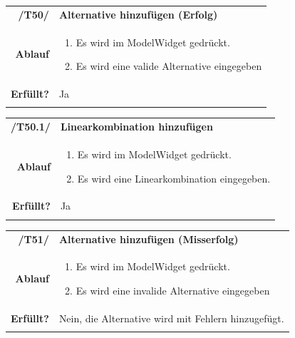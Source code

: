 \documentclass{article}
\newcommand{\guibutton}[1]{\fbox{\texttt{#1}}}
\begin{document}
\begin{table}[H]
\begin{tabularx}{\textwidth}{rX}
\vspace{1mm}
\textbf{/T50/}         & \textbf{Alternative hinzufügen (Erfolg)} \\ \vspace{1mm}
\textbf{Ablauf} & 
\begin{enumerate}
        \item Es wird \guibutton{+} im ModelWidget gedrückt.
        \item Es wird eine valide Alternative eingegeben
    \end{enumerate} \\ \vspace{1mm}
\textbf{Erfüllt?}  & Ja  \\ \vspace{1mm}
\end{tabularx}
\end{table}

\begin{table}[H]
\begin{tabularx}{\textwidth}{rX}
\vspace{1mm}
\textbf{/T50.1/}         & \textbf{Linearkombination hinzufügen} \\ \vspace{1mm}
\textbf{Ablauf} & 
\begin{enumerate}
        \item Es wird \guibutton{+} im ModelWidget gedrückt.
        \item Es wird eine Linearkombination eingegeben.
    \end{enumerate} \\ \vspace{1mm}
\textbf{Erfüllt?}  & Ja  \\ \vspace{1mm}
\end{tabularx}
\end{table}

\begin{table}[H]
\begin{tabularx}{\textwidth}{rX}
\vspace{1mm}
\textbf{/T51/}         & \textbf{Alternative hinzufügen (Misserfolg)} \\ \vspace{1mm}
\textbf{Ablauf} & 
\begin{enumerate}
        \item Es wird \guibutton{+} im ModelWidget gedrückt.
        \item Es wird eine invalide Alternative eingegeben
    \end{enumerate} \\ \vspace{1mm}
\textbf{Erfüllt?}  & Nein, die Alternative wird mit Fehlern hinzugefügt.  \\ \vspace{1mm}
\end{tabularx}
\end{table}
\end{document}
